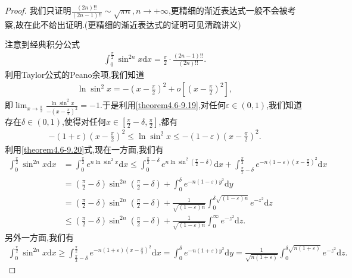\documentclass[../../main.tex]{subfiles}%
\begin{document}
\begin{proof}
我们只证明$\frac{(2n)!!}{(2n-1)!!}\sim \sqrt{\pi n},n\rightarrow +\infty$,更精细的渐近表达式一般不会被考察,故在此不给出证明.(更精细的渐近表达式的证明可见清疏讲义)

注意到经典积分公式
\begin{align}\label{theorem4.6-1.1}
\int_{0}^{\frac{\pi}{2}}\sin^{2n}x \mathrm{d}x=\frac{\pi}{2}\cdot\frac{(2n - 1)!!}{(2n)!!}.
\end{align}
利用Taylor公式的Peano余项,我们知道
\begin{align}\label{theorem4.6-9.19}
\ln\sin^{2}x=-\left(x - \frac{\pi}{2}\right)^{2}+o\left[\left(x - \frac{\pi}{2}\right)^{2}\right],
\end{align}
即\(\lim_{x\rightarrow \frac{\pi}{2}}\frac{\ln\sin^{2}x}{-(x - \frac{\pi}{2})^{2}}=-1\).于是利用\eqref{theorem4.6-9.19},对任何\(\varepsilon\in(0,1)\),我们知道存在\(\delta\in(0,1)\),使得对任何\(x\in[\frac{\pi}{2}-\delta,\frac{\pi}{2}]\),都有
\begin{align}\label{theorem4.6-9.20}
-(1 + \varepsilon)\left(x - \frac{\pi}{2}\right)^{2}\leqslant\ln\sin^{2}x\leqslant-(1 - \varepsilon)\left(x - \frac{\pi}{2}\right)^{2}.
\end{align}
利用\eqref{theorem4.6-9.20}式,现在一方面,我们有
\begin{align*}
\int_{0}^{\frac{\pi}{2}}\sin^{2n}x \mathrm{d}x&=\int_{0}^{\frac{\pi}{2}}e^{n\ln\sin^{2}x}\mathrm{d}x
\leqslant\int_{0}^{\frac{\pi}{2}-\delta}e^{n\ln\sin^{2}(\frac{\pi}{2}-\delta)}\mathrm{d}x+\int_{\frac{\pi}{2}-\delta}^{\frac{\pi}{2}}e^{-n(1 - \varepsilon)(x - \frac{\pi}{2})^{2}}\mathrm{d}x\\
&=(\frac{\pi}{2}-\delta)\sin^{2n}(\frac{\pi}{2}-\delta)+\int_{0}^{\delta}e^{-n(1 - \varepsilon)y^{2}}\mathrm{d}y\\
&=(\frac{\pi}{2}-\delta)\sin^{2n}(\frac{\pi}{2}-\delta)+\frac{1}{\sqrt{(1 - \varepsilon)n}}\int_{0}^{\delta\sqrt{(1 - \varepsilon)n}}e^{-z^{2}}\mathrm{d}z\\
&\leqslant(\frac{\pi}{2}-\delta)\sin^{2n}(\frac{\pi}{2}-\delta)+\frac{1}{\sqrt{(1 - \varepsilon)n}}\int_{0}^{\infty}e^{-z^{2}}\mathrm{d}z.
\end{align*}
另外一方面,我们有
\begin{align*}
\int_{0}^{\frac{\pi}{2}}\sin^{2n}x \mathrm{d}x\geqslant\int_{\frac{\pi}{2}-\delta}^{\frac{\pi}{2}}e^{-n(1 + \varepsilon)(x - \frac{\pi}{2})^{2}}\mathrm{d}x
=\int_{0}^{\delta}e^{-n(1 + \varepsilon)y^{2}}\mathrm{d}y
=\frac{1}{\sqrt{n(1 + \varepsilon)}}\int_{0}^{\delta\sqrt{n(1 + \varepsilon)}}e^{-z^{2}}\mathrm{d}z.

\end{align*}
\end{proof}
\end{document}
